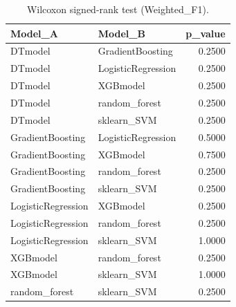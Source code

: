 \begin{table}[t]
\centering
\begin{tabular}{llr}
\toprule
Model_A & Model_B & p_value \\
\midrule
DTmodel & GradientBoosting & 0.2500 \\
DTmodel & LogisticRegression & 0.2500 \\
DTmodel & XGBmodel & 0.2500 \\
DTmodel & random_forest & 0.2500 \\
DTmodel & sklearn_SVM & 0.2500 \\
GradientBoosting & LogisticRegression & 0.5000 \\
GradientBoosting & XGBmodel & 0.7500 \\
GradientBoosting & random_forest & 0.2500 \\
GradientBoosting & sklearn_SVM & 0.2500 \\
LogisticRegression & XGBmodel & 0.2500 \\
LogisticRegression & random_forest & 0.2500 \\
LogisticRegression & sklearn_SVM & 1.0000 \\
XGBmodel & random_forest & 0.2500 \\
XGBmodel & sklearn_SVM & 1.0000 \\
random_forest & sklearn_SVM & 0.2500 \\
\bottomrule
\end{tabular}
\caption{Wilcoxon signed-rank test (Weighted_F1).}
\label{tab:wilcoxon_Weighted_F1}
\end{table}